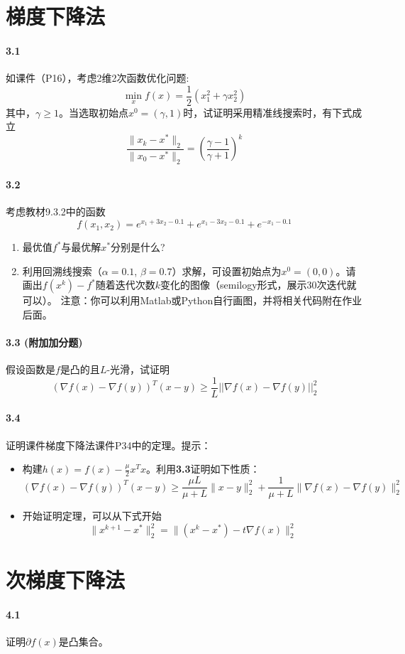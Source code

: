 \documentclass[12pt,a4paper]{article}
\begin{document}
\section{梯度下降法}
\paragraph{3.1} 如课件（P16），考虑2维2次函数优化问题:
$$\min_x f(x)=\frac{1}{2}\left(x_1^2+\gamma x_2^2\right)$$
其中，$\gamma \geq 1$。当选取初始点$x^{0}=(\gamma,1)$时，试证明采用精准线搜索时，有下式成立
$$\frac{\|{x_k-x^*}\|_2}{\|{x_0-x^*}\|_2}=
\left(\frac{\gamma-1}{\gamma+1}\right)^k$$


\paragraph{3.2} 考虑教材9.3.2中的函数
$$f(x_1, x_2) = e^{x_1+3x_2−0.1} + e^{x_1−3x_2−0.1} + e^{−x_1−0.1}$$
\begin{enumerate}
	\item 最优值$f^*$与最优解$x^*$分别是什么?
	\item 利用回溯线搜索（$\alpha=0.1$, $\beta=0.7$）求解，可设置初始点为$x^0=(0,0)$。请画出$f(x^k)-f^*$随着迭代次数$k$变化的图像（semilogy形式，展示30次迭代就可以）。 
    注意：你可以利用Matlab或Python自行画图，并将相关代码附在作业后面。
\end{enumerate}

\paragraph{3.3 (附加加分题)}  假设函数是$f$是凸的且$L$-光滑，试证明
$$\left(\nabla f(x)-\nabla f(y)\right)^T(x-y) \geq \frac{1}{L} ||\nabla f(x)-\nabla f(y)||_2^2$$

\paragraph{3.4} 证明课件梯度下降法课件P34中的定理。提示：
\begin{itemize}
	\item[a] 构建$h(x)=f(x)-\frac{\mu}{2}x^Tx$。利用\textbf{3.3}证明如下性质：
    $$(\nabla f(x) -\nabla f(y))^T(x-y) \geq \frac{\mu L}{\mu+L} \|x-y\|_2^2+\frac{1}{\mu+L}\|\nabla f(x) - \nabla f(y)\|^2_2$$
	\item[b] 开始证明定理，可以从下式开始
    $$\|x^{k+1}-x^*\|_2^2=\|(x^k-x^*)-t\nabla f(x)\|_2^2$$
\end{itemize}


\section{次梯度下降法}
\paragraph{4.1} 证明$\partial f(x)$是凸集合。 
\end{document}
